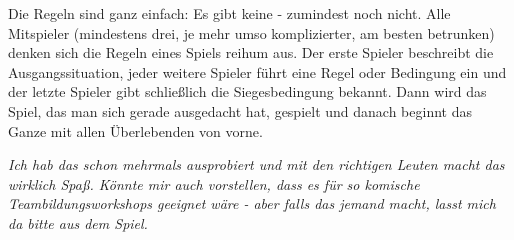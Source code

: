 \documentclass[a5paper,pagesize,10pt,bibtotoc,pointlessnumbers,normalheadings,DIV=9,twoside=false]{scrbook}
\begin{document}
Die Regeln sind ganz einfach: Es gibt keine - zumindest noch nicht.
Alle Mitspieler (mindestens drei, je mehr umso komplizierter, am besten betrunken) denken sich die Regeln eines Spiels reihum aus.
Der erste Spieler beschreibt die Ausgangssituation, jeder weitere Spieler führt eine Regel oder Bedingung ein und der letzte Spieler gibt schließlich die Siegesbedingung bekannt.
Dann wird das Spiel, das man sich gerade ausgedacht hat, gespielt und danach beginnt das Ganze mit allen Überlebenden von vorne.

\emph{Ich hab das schon mehrmals ausprobiert und mit den richtigen Leuten macht das wirklich Spaß. Könnte mir auch vorstellen, dass es für so komische Teambildungsworkshops geeignet wäre - aber falls das jemand macht, lasst mich da bitte aus dem Spiel.}
\end{document}
